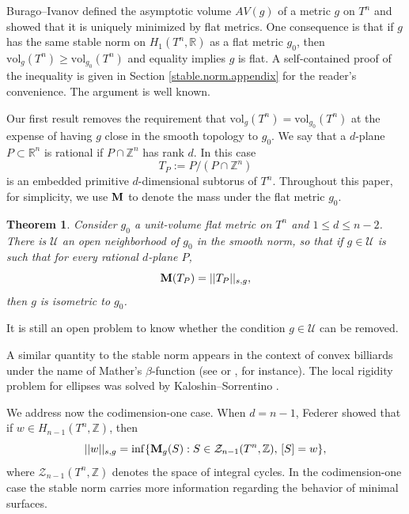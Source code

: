 \documentclass[11pt]{amsart}
\def\R{\mathbb R}
\def\Z{\mathbb Z}
\def\vol{\mathrm{vol}}
\newtheorem{thm}{Theorem}[section]
\theoremstyle{remark}
\theoremstyle{definition}
\begin{document}
	Burago--Ivanov \cite{burago-ivanov-gafapaper} defined the asymptotic volume $AV(g)$ of a metric $g$ on $T^n$ and showed that it is uniquely minimized by flat metrics.  One consequence is that if $g$ has the same stable norm on $H_1(T^n,\R)$ as a flat metric $g_0$, then $\vol_g(T^n)\geq \vol_{g_0}(T^n)$ and equality implies $g$ is flat. A self-contained proof of the inequality is given in Section \ref{stable.norm.appendix} for the reader's convenience. The argument is well known.
	
	
	Our first result removes the requirement that  $\vol_g(T^n)=\vol_{g_0}(T^n)$ at the expense of having $g$ close in the smooth topology to $g_0$.
	We say that a $d$-plane $P\subset \R^n$ is rational if $P\cap \Z^n$ has rank $d$. In this case 
	$$
	T_P:=P/(P\cap \Z^n)
	$$
	is an embedded primitive $d$-dimensional subtorus of $T^n$. {Throughout this paper, for simplicity, we use ${\bf M}$ to denote the mass under the flat metric $g_0$.}
	\begin{thm}\label{higher.codimention.intro}
		Consider  $g_0$ a unit-volume flat metric on $T^n$ and $1\leq d\leq n-2$. There is $\mathcal U$ an  open neighborhood of $g_0$ in the smooth norm, so that if $g\in \mathcal U$ is such that for every rational $d$-plane $P$,
		$$
		{{\bf M}(T_P)=||T_P||_{s,g},}
		$$
		then $g$ is isometric to $g_0$.
	\end{thm}
	It is {still} an open problem to know whether the condition  $g\in \mathcal U$ can be removed. 
	
	A similar quantity to the stable norm appears in the context of convex billiards under the name of Mather's $\beta$-function (see \cite[Sections~1.4.1--1.4.2]{FKS24} or \cite{FLS25}, for instance). The local rigidity problem for ellipses was solved by Kaloshin--Sorrentino \cite[Corollary~13]{KS18}.
	
	
	
	We address now the codimension-one case. When $d=n-1$, Federer \cite{Federer74} showed that if $w\in H_{n-1}(T^n,\Z)$, then
	$$||w||_{s,g}=\inf\{{\bf M}_{g}(S):S\in \mathcal Z_{n-1}(T^n,\Z),\,[S]=w\},$$
	where $\mathcal Z_{n-1}(T^n,\Z)$ denotes the space of integral cycles. In the codimension-one case the stable norm carries more information regarding the behavior of minimal surfaces. 
	
\end{document}
